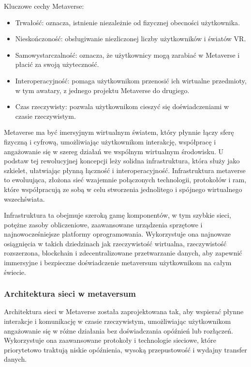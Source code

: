 Kluczowe cechy Metaverse:

\begin{itemize}
    \item Trwałość:  oznacza, istnienie niezależnie od fizycznej obecności użytkownika\cite{metaverseAFullDive}.
    \item Nieskończoność: obsługiwanie niezliczonej liczby użytkowników i światów VR\cite{metaverseAFullDive}.
    \item Samowystarczalność: oznacza, że użytkownicy mogą zarabiać w Metaverse i płacić za swoją użyteczność\cite{metaverseAFullDive}.
    \item Interoperacyjność: pomaga użytkownikom przenosić ich wirtualne przedmioty, w tym awatary, z jednego projektu Metaverse do drugiego\cite{metaverseAFullDive}.
    \item Czas rzeczywisty: pozwala użytkownikom cieszyć się doświadczeniami w czasie rzeczywistym\cite{metaverseAFullDive}.
\end{itemize}


Metaverse ma być imersyjnym wirtualnym światem, który płynnie łączy sferę fizyczną i cyfrową, umożliwiając użytkownikom interakcję, współpracę i angażowanie się w szereg działań we wspólnym wirtualnym środowisku. U podstaw tej rewolucyjnej koncepcji leży solidna infrastruktura, która służy jako szkielet, ułatwiając płynną łączność i interoperacyjność. Infrastruktura metaverse to ewoluująca, złożona sieć wzajemnie połączonych technologii, protokołów i ram, które współpracują ze sobą w celu stworzenia jednolitego i spójnego wirtualnego wszechświata\cite{metaverseInfrastructureIEEE}.

Infrastruktura ta obejmuje szeroką gamę komponentów, w tym szybkie sieci, potężne zasoby obliczeniowe, zaawansowane urządzenia sprzętowe i najnowocześniejsze platformy oprogramowania. Wykorzystuje ona najnowsze osiągnięcia w takich dziedzinach jak rzeczywistość wirtualna, rzeczywistość rozszerzona, blockchain i zdecentralizowane przetwarzanie danych, aby zapewnić immersyjne i bezpieczne doświadczenie metaversum użytkownikom na całym świecie\cite{metaverseInfrastructureIEEE}.

\subsubsection{Architektura sieci w metaversum}

Architektura sieci w Metaverse została zaprojektowana tak, aby wspierać płynne interakcje i komunikację w czasie rzeczywistym, umożliwiając użytkownikom angażowanie się w różne działania bez doświadczania opóźnień lub rozłączeń. Wykorzystuje ona zaawansowane protokoły i technologie sieciowe, które priorytetowo traktują niskie opóźnienia, wysoką przepustowość i wydajny transfer danych\cite{metaverseInfrastructureIEEE}.


